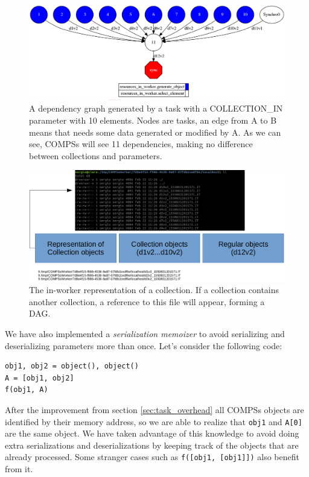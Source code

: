 \begin{figure}[ht!]
    \centering
    \includegraphics[scale = 0.4]{figures/dependency_col_in_graph.png}
    \caption{A dependency graph generated by a task with a COLLECTION\_IN parameter with 10 elements. Nodes are tasks, an edge from A to B means that needs some data generated or modified by A. As we can see, COMPSs will see 11 dependencies, making no difference between collections and parameters.}
    \label{fig:col_in_graph_example}
\end{figure}

\begin{figure}
    \centering
    \includegraphics[scale = 0.5]{figures/collection_representation.png}
    \caption{The in-worker representation of a collection. If a collection contains another collection, a reference to this file will appear, forming a DAG.}
    \label{fig:collection_file_hierarchy}
\end{figure}
We have also implemented a \textit{serialization memoizer} to avoid serializing and deserializing parameters more than once. Let's consider the following code:
\begin{verbatim}
obj1, obj2 = object(), object()
A = [obj1, obj2]
f(obj1, A)
\end{verbatim}
After the improvement from section \ref{sec:task_overhead} all COMPSs objects are identified by their memory address, so we are able to realize that \verb|obj1| and \verb|A[0]| are the same object. We have taken advantage of this knowledge to avoid doing extra serializations and deserializations by keeping track of the objects that are already processed. Some stranger cases such as \verb|f([obj1, [obj1]])| also benefit from it.\\

